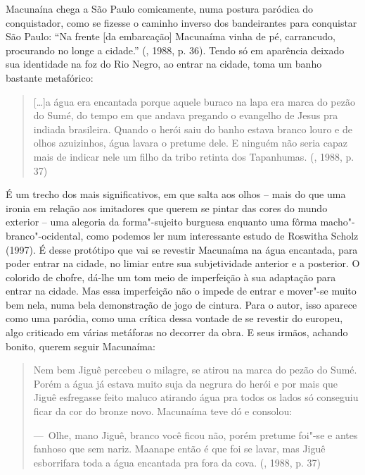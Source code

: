 {Macunaína chega a São Paulo comicamente, numa postura paródica do
conquistador, como se fizesse o caminho inverso dos bandeirantes para
conquistar São Paulo: ``Na frente [da embarcação] Macunaíma vinha de
pé, carrancudo, procurando no longe a cidade.'' (, 1988, p. 36).
Tendo só em aparência deixado sua identidade na foz do Rio Negro, ao
entrar na cidade, toma um banho bastante metafórico:

\begin{quote}
[\ldots{}]a água era encantada porque aquele buraco na lapa era marca do
pezão do Sumé, do tempo em que andava pregando o evangelho de Jesus pra
indiada brasileira. Quando o herói saiu do banho estava branco louro e
de olhos azuizinhos, água lavara o pretume dele. E ninguém não seria
capaz mais de indicar nele um filho da tribo retinta dos Tapanhumas.
(, 1988, p. 37)
\end{quote}

É um trecho dos mais significativos, em que salta aos olhos -- mais do
que uma ironia em relação aos imitadores que querem se pintar das cores
do mundo exterior -- uma alegoria da forma"-sujeito burguesa enquanto uma
fôrma macho"-branco"-ocidental, como podemos ler num interessante estudo
de Roswitha Scholz (1997). É desse protótipo que vai se revestir
Macunaíma na água encantada, para poder entrar na cidade, no limiar
entre sua subjetividade anterior e a posterior. O colorido de chofre,
dá-lhe um tom meio de imperfeição à sua adaptação para entrar na cidade.
Mas essa imperfeição não o impede de entrar e mover"-se muito bem nela,
numa bela demonstração de jogo de cintura. Para o autor, isso aparece
como uma paródia, como uma crítica dessa vontade de se revestir do
europeu, algo criticado em várias metáforas no decorrer da obra. E seus
irmãos, achando bonito, querem seguir Macunaíma:

\begin{quote}
Nem bem Jiguê percebeu o milagre, se atirou na marca do pezão do Sumé.
Porém a água já estava muito suja da negrura do herói e por mais que
Jiguê esfregasse feito maluco atirando água pra todos os lados só
conseguiu ficar da cor do bronze novo. Macunaíma teve dó e consolou:

---~Olhe, mano Jiguê, branco você ficou não, porém pretume foi"-se e
antes fanhoso que sem nariz. Maanape então é que foi se lavar, mas Jiguê
esborrifara toda a água encantada pra fora da cova. (, 1988, p.
37)
\end{quote}

}
